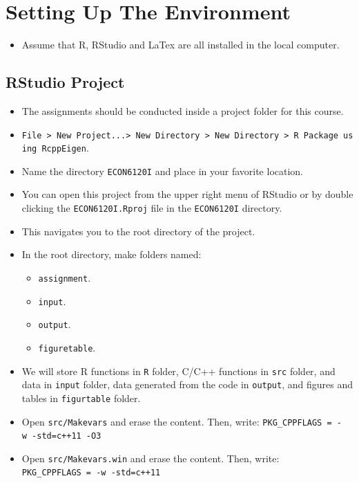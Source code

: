 \documentclass[]{book}
\providecommand{\tightlist}{%
  \setlength{\itemsep}{0pt}\setlength{\parskip}{0pt}}
\begin{document}
\section{Setting Up The Environment}\label{setting-up-the-environment}

\begin{itemize}
\tightlist
\item
  Assume that R, RStudio and LaTex are all installed in the local
  computer.
\end{itemize}

\subsection{RStudio Project}\label{rstudio-project}

\begin{itemize}
\tightlist
\item
  The assignments should be conducted inside a project folder for this
  course.
\item
  \texttt{File\ \textgreater{}\ New\ Project...\textgreater{}\ New\ Directory\ \textgreater{}\ New\ Directory\ \textgreater{}\ R\ Package\ using\ RcppEigen}.
\item
  Name the directory \texttt{ECON6120I} and place in your favorite
  location.
\item
  You can open this project from the upper right menu of RStudio or by
  double clicking the \texttt{ECON6120I.Rproj} file in the
  \texttt{ECON6120I} directory.
\item
  This navigates you to the root directory of the project.
\item
  In the root directory, make folders named:

  \begin{itemize}
  \tightlist
  \item
    \texttt{assignment}.
  \item
    \texttt{input}.
  \item
    \texttt{output}.
  \item
    \texttt{figuretable}.
  \end{itemize}
\item
  We will store R functions in \texttt{R} folder, C/C++ functions in
  \texttt{src} folder, and data in \texttt{input} folder, data generated
  from the code in \texttt{output}, and figures and tables in
  \texttt{figurtable} folder.
\item
  Open \texttt{src/Makevars} and erase the content. Then, write:
  \texttt{PKG\_CPPFLAGS\ =\ -w\ -std=c++11\ -O3}
\item
  Open \texttt{src/Makevars.win} and erase the content. Then, write:
  \texttt{PKG\_CPPFLAGS\ =\ -w\ -std=c++11}
\end{itemize}
\end{document}
